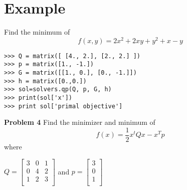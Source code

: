 \section*{Example}
Find the minimum of 
\begin{equation}
f(x,y) = 2x^2 +2xy + y^2 +x -y
\end{equation}
\begin{lstlisting}
>>> Q = matrix([ [4., 2.], [2., 2.] ])
>>> p = matrix([1., -1.])
>>> G = matrix([[1., 0.], [0., -1.]])
>>> h = matrix([0.,0.])
>>> sol=solvers.qp(Q, p, G, h)
>>> print(sol['x'])
>>> print sol['primal objective']
\end{lstlisting}

\textbf{Problem 4}
Find the minimizer and minimum of 
\begin{equation}
f(x) = \frac{1}{2}x^tQx - x^Tp
\end{equation}
where 

\begin{center}
$Q =
\begin{bmatrix}
3 & 0 & 1\\
0 & 4 & 2\\
1 & 2 & 3\\
\end{bmatrix}
$
and $p = 
\begin{bmatrix}
3\\
0\\
1\\
\end{bmatrix}
$
\end{center}
